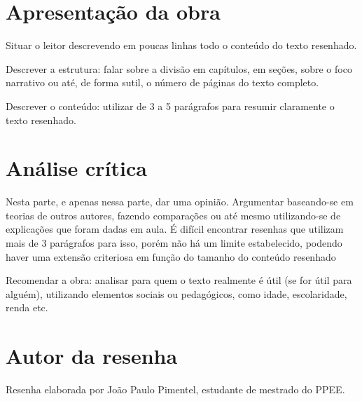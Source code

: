 \documentclass[11pt]{article}
\begin{document}
\section{Apresentação da obra}
Situar o leitor descrevendo em poucas linhas todo o conteúdo do texto resenhado.

Descrever a estrutura: falar sobre a divisão em capítulos, em seções, sobre o foco narrativo ou até, de forma sutil, o número de páginas do texto completo.

Descrever o conteúdo: utilizar de 3 a 5 parágrafos para resumir claramente o texto resenhado.

\section{Análise crítica}
Nesta parte, e apenas nessa parte, dar uma opinião. Argumentar baseando-se em teorias de outros autores, fazendo comparações ou até mesmo utilizando-se de explicações que foram dadas em aula. É difícil encontrar resenhas que utilizam mais de 3 parágrafos para isso, porém não há um limite estabelecido, podendo haver uma extensão criteriosa em função do tamanho do conteúdo resenhado

Recomendar a obra: analisar para quem o texto realmente é útil (se for útil para alguém), utilizando elementos sociais ou pedagógicos, como idade, escolaridade, renda etc.

\section{Autor da resenha}
Resenha elaborada por João Paulo Pimentel, estudante de mestrado do PPEE. 



\end{document}
